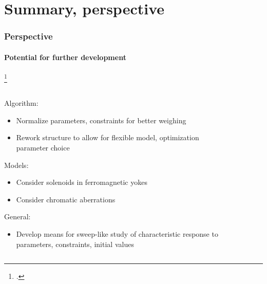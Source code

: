 \documentclass[10pt]{beamer}
\newcommand{\rfn}{\setcounter{footnote}{0}}
\begin{document}
\section{Summary, perspective}

\begin{frame}
  \frametitle{Perspective}
  \framesubtitle{Potential for further development}
  \rfn
  \vspace{-10cm}
  \footcite{Disser}
  \vspace{10cm}
  \begin{columns}
    \begin{column}{0.7\textwidth}
      Algorithm:
      \begin{itemize}
        \item Normalize parameters, constraints for better weighing
        \item Rework structure to allow for flexible model, optimization parameter choice
      \end{itemize}
      \vspace{0.5cm}
      Models:
      \begin{itemize}
        \item Consider solenoids in ferromagnetic yokes
        \item Consider chromatic aberrations
      \end{itemize}
      \vspace{0.5cm}
      General:
      \begin{itemize}
        \item Develop means for sweep-like study of characteristic response to parameters, constraints, initial values
      \end{itemize}
    \end{column}
    \begin{column}{0.3\textwidth}
        \begin{figure}

\end{figure}
\end{column}
\end{columns}
\end{frame}
\end{document}
